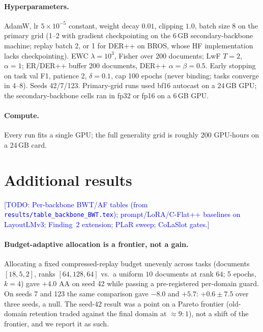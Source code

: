 \documentclass{article}
\newcommand{\todo}[1]{\textcolor{blue}{[TODO: #1]}}
\begin{document}
\paragraph{Hyperparameters.} AdamW, lr $5\times10^{-5}$ constant, weight decay $0.01$, clipping $1.0$, batch size 8 on the primary grid (1--2 with gradient checkpointing on the 6\,GB secondary-backbone machine; replay batch 2, or 1 for DER++ on BROS, whose HF implementation lacks checkpointing). EWC $\lambda{=}10^3$, Fisher over 200 documents; LwF $T{=}2$, $\alpha{=}1$; ER/DER++ buffer 200 documents, DER++ $\alpha{=}\beta{=}0.5$. Early stopping on task val F1, patience 2, $\delta{=}0.1$, cap 100 epochs (never binding; tasks converge in 4--8). Seeds 42/7/123. Primary-grid runs used bf16 autocast on a 24\,GB GPU; the secondary-backbone cells ran in fp32 or fp16 on a 6\,GB GPU.

\paragraph{Compute.} Every run fits a single GPU; the full generality grid is roughly 200 GPU-hours on a 24\,GB card.

\section{Additional results}
\label{app:extra}
\todo{Per-backbone BWT/AF tables (from \texttt{results/table\_backbone\_BWT.tex}); prompt/LoRA/C-Flat++ baselines on LayoutLMv3; Finding~2 extension; PLaR sweep; CoLaSlot gates.}

\paragraph{Budget-adaptive allocation is a frontier, not a gain.} Allocating a fixed compressed-replay budget unevenly across tasks (documents $[18,5,2]$, ranks $[64,128,64]$ vs.\ a uniform $10$ documents at rank $64$; 5 epochs, $k{=}4$) gave $+4.0$ AA on seed 42 while passing a pre-registered per-domain guard. On seeds 7 and 123 the same comparison gave $-8.0$ and $+5.7$: $+0.6\pm7.5$ over three seeds, a null. The seed-42 result was a point on a Pareto frontier (old-domain retention traded against the final domain at $\approx9{:}1$), not a shift of the frontier, and we report it as such.
\end{document}
